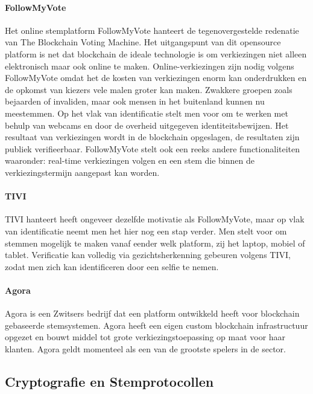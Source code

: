 				\paragraph{FollowMyVote}
					Het online stemplatform FollowMyVote hanteert de tegenovergestelde redenatie van The Blockchain Voting Machine. Het uitgangspunt van dit opensource platform is net dat blockchain de ideale technologie is om verkiezingen niet alleen elektronisch maar ook online te maken. Online-verkiezingen zijn nodig volgens FollowMyVote omdat het de kosten van verkiezingen enorm kan onderdrukken en de opkomst van kiezers vele malen groter kan maken.  Zwakkere groepen zoals bejaarden of invaliden, maar ook mensen in het buitenland kunnen nu  meestemmen.  Op het vlak van identificatie stelt men voor om te werken met behulp van webcams en door de overheid uitgegeven identiteitsbewijzen. Het resultaat van verkiezingen wordt in de blockchain opgeslagen, de resultaten zijn publiek verifieerbaar. FollowMyVote stelt ook een reeks andere functionaliteiten waaronder: real-time verkiezingen volgen en een stem die binnen de verkiezingstermijn aangepast kan worden. 
				\paragraph{TIVI}
					TIVI hanteert heeft ongeveer dezelfde motivatie als FollowMyVote, maar op vlak van identificatie neemt men het hier nog een stap verder. Men stelt voor om stemmen mogelijk te maken vanaf eender welk platform, zij het laptop, mobiel of tablet. Verificatie kan volledig via gezichtsherkenning gebeuren volgens TIVI, zodat men zich kan identificeren door een selfie te nemen.
				\paragraph{Agora}
					Agora is een Zwitsers bedrijf dat een platform ontwikkeld heeft voor blockchain gebaseerde stemsystemen. Agora heeft een eigen custom blockchain infrastructuur opgezet en bouwt middel tot grote verkiezingstoepassing op maat voor haar klanten. Agora geldt momenteel als een van de grootste spelers in de sector.
					
	\subsection{Cryptografie en Stemprotocollen}
